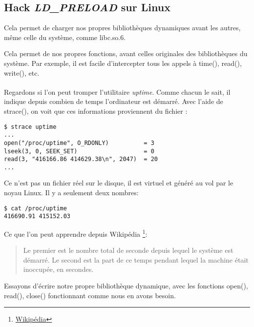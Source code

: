 \subsection{Hack \emph{LD\_PRELOAD} sur Linux}

\label{ld_preload}

Cela permet de charger nos propres bibliothèques dynamiques avant les autres, même celle du système, comme libc.so.6.

Cela permet de  nos propres fonctions, avant celles originales des bibliothèques du système.
Par exemple, il est facile d'intercepter tous les appels à
time(), read(), write(), etc. \\
\\
Regardons si l'on peut tromper l'utilitaire \emph{uptime}.
Comme chacun le sait, il indique depuis combien de temps l'ordinateur est démarré.
Avec l'aide de strace(), on voit que ces informations proviennent du fichier :

\begin{lstlisting}
$ strace uptime 
...
open("/proc/uptime", O_RDONLY)          = 3
lseek(3, 0, SEEK_SET)                   = 0
read(3, "416166.86 414629.38\n", 2047)  = 20
...
\end{lstlisting}

Ce n'est pas un fichier réel sur le disque, il est virtuel et généré au vol par le noyau Linux.
Il y a seulement deux nombres:

\begin{lstlisting}
$ cat /proc/uptime
416690.91 415152.03
\end{lstlisting}

Ce que l'on peut apprendre depuis Wikipédia
\footnote{\href{http://go.yurichev.com/17043}{Wikipédia}}:

\begin{framed}
\begin{quotation}
Le premier est le nombre total de seconde depuis lequel le système est démarré.
Le second est la part de ce temps pendant lequel la machine était inoccupée, en secondes.
\end{quotation}
\end{framed}


Essayons d'écrire notre propre bibliothèque dynamique, avec les fonctions
open(), read(), close() fonctionnant comme nous en avons besoin.

